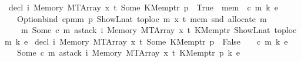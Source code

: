 \begin{isabellebody}
{\isacharbar}{\kern0pt}\ {\isachardoublequoteopen}decl\ i\ {\isacharparenleft}{\kern0pt}Memory\ {\isacharparenleft}{\kern0pt}MTArray\ x\ t{\isacharparenright}{\kern0pt}{\isacharparenright}{\kern0pt}\ {\isacharparenleft}{\kern0pt}Some\ {\isacharparenleft}{\kern0pt}KMemptr\ p{\isacharcomma}{\kern0pt}\ {\isacharunderscore}{\kern0pt}{\isacharparenright}{\kern0pt}{\isacharparenright}{\kern0pt}\ True\ {\isacharunderscore}{\kern0pt}\ mem\ {\isacharunderscore}{\kern0pt}\ {\isacharparenleft}{\kern0pt}c{\isacharcomma}{\kern0pt}\ m{\isacharcomma}{\kern0pt}\ k{\isacharcomma}{\kern0pt}\ e{\isacharparenright}{\kern0pt}\ {\isacharequal}{\kern0pt}\isanewline
\ \ \ Option{\isachardot}{\kern0pt}bind\ {\isacharparenleft}{\kern0pt}cpm{}m\ p\ {\isacharparenleft}{\kern0pt}ShowL\isactrlsub n\isactrlsub a\isactrlsub t\ {\isacharparenleft}{\kern0pt}toploc\ m{\isacharparenright}{\kern0pt}{\isacharparenright}{\kern0pt}\ x\ t\ mem\ {\isacharparenleft}{\kern0pt}snd\ {\isacharparenleft}{\kern0pt}allocate\ m{\isacharparenright}{\kern0pt}{\isacharparenright}{\kern0pt}{\isacharparenright}{\kern0pt}\isanewline
\ \ \ \ {\isacharparenleft}{\kern0pt}{\isasymlambda}m{\isacharprime}{\kern0pt}{\isachardot}{\kern0pt}\ Some\ {\isacharparenleft}{\kern0pt}c{\isacharcomma}{\kern0pt}\ m{\isacharprime}{\kern0pt}{\isacharcomma}{\kern0pt}\ astack\ i\ {\isacharparenleft}{\kern0pt}Memory\ {\isacharparenleft}{\kern0pt}MTArray\ x\ t{\isacharparenright}{\kern0pt}{\isacharparenright}{\kern0pt}\ {\isacharparenleft}{\kern0pt}KMemptr\ {\isacharparenleft}{\kern0pt}ShowL\isactrlsub n\isactrlsub a\isactrlsub t\ {\isacharparenleft}{\kern0pt}toploc\ m{\isacharparenright}{\kern0pt}{\isacharparenright}{\kern0pt}{\isacharparenright}{\kern0pt}\ {\isacharparenleft}{\kern0pt}k{\isacharcomma}{\kern0pt}\ e{\isacharparenright}{\kern0pt}{\isacharparenright}{\kern0pt}{\isacharparenright}{\kern0pt}{\isachardoublequoteclose}\isanewline
{\isacharbar}{\kern0pt}\ {\isachardoublequoteopen}decl\ i\ {\isacharparenleft}{\kern0pt}Memory\ {\isacharparenleft}{\kern0pt}MTArray\ x\ t{\isacharparenright}{\kern0pt}{\isacharparenright}{\kern0pt}\ {\isacharparenleft}{\kern0pt}Some\ {\isacharparenleft}{\kern0pt}KMemptr\ p{\isacharcomma}{\kern0pt}\ {\isacharunderscore}{\kern0pt}{\isacharparenright}{\kern0pt}{\isacharparenright}{\kern0pt}\ False\ {\isacharunderscore}{\kern0pt}\ {\isacharunderscore}{\kern0pt}\ {\isacharunderscore}{\kern0pt}\ {\isacharparenleft}{\kern0pt}c{\isacharcomma}{\kern0pt}\ m{\isacharcomma}{\kern0pt}\ k{\isacharcomma}{\kern0pt}\ e{\isacharparenright}{\kern0pt}\ {\isacharequal}{\kern0pt}\isanewline
\ \ \ Some\ {\isacharparenleft}{\kern0pt}c{\isacharcomma}{\kern0pt}\ m{\isacharcomma}{\kern0pt}\ astack\ i\ {\isacharparenleft}{\kern0pt}Memory\ {\isacharparenleft}{\kern0pt}MTArray\ x\ t{\isacharparenright}{\kern0pt}{\isacharparenright}{\kern0pt}\ {\isacharparenleft}{\kern0pt}KMemptr\ p{\isacharparenright}{\kern0pt}\ {\isacharparenleft}{\kern0pt}k{\isacharcomma}{\kern0pt}\ e{\isacharparenright}{\kern0pt}{\isacharparenright}{\kern0pt}{\isachardoublequoteclose}\isanewline

\end{isabellebody}
